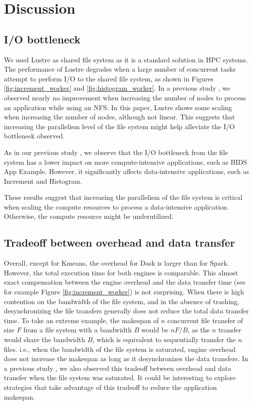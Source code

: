 \documentclass[conference]{IEEEtran}
\begin{document}
\section{Discussion}
\subsection{I/O bottleneck}
We used Lustre as shared file system as it is a standard solution in HPC systems.
The performance of Lustre degrades when a large number of concurrent tasks attempt to perform I/O to the shared file system, as shown in Figures \ref{fig:increment_worker} and \ref{fig:histogram_worker}.
In a previous study \cite{8943502}, we observed nearly no improvement when increasing the number of nodes to process an application while using an NFS.
In this paper, Lustre shows some scaling when increasing the number of nodes, although not linear.
This suggests that increasing the parallelism level of the file system might help alleviate the I/O bottleneck observed.

As in our previous study \cite{8943502}, we observe that the I/O bottleneck from the file system has a lower impact on more compute-intensive applications, such as BIDS App Example.
However, it significantly affects data-intensive applications, such as Increment and Histogram.

These results suggest that increasing the parallelism of the file system is critical when scaling the compute resources to process a data-intensive application.
Otherwise, the compute resource might be underutilized.

\subsection{Tradeoff between overhead and data transfer}
Overall, except for Kmeans, the overhead for Dask is larger than for Spark.
However, the total execution time for both engines is comparable.
This almost exact compensation between the engine overhead and the data transfer time (see for example Figure \ref{fig:increment_worker}) is not surprising.
When there is high contention on the bandwidth of the file system, and in the absence of trashing, desynchronizing the file transfers generally does not reduce the total data transfer time.
To take an extreme example, the makespan of $n$ concurrent file transfer of size $F$ from a file system with a bandwidth $B$ would be $nF/B$,
as the $n$ transfer would share the bandwidth $B$, which is equivalent to sequentially transfer the $n$ files.
i.e., when the bandwidth of the file system is saturated, engine overhead does not increase the makespan as long as it desynchronizes the data transfers.
In a previous study \cite{8943502}, we also observed this tradeoff between overhead and data transfer when the file system was saturated.
It could be interesting to explore strategies that take advantage of this tradeoff to reduce the application makespan.
\end{document}

